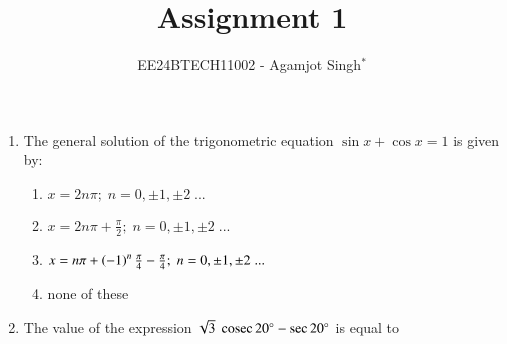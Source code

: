 \documentclass[journal,12pt,twocolumn]{IEEEtran}
\theoremstyle{remark}
\begin{document}

\title{Assignment 1}
\author{EE24BTECH11002 - Agamjot Singh$^{*}$%
}
\maketitle
\newpage
\bigskip

\begin{enumerate}
\section*{ C. MCQs with One Correct Answer}
    \setcounter{enumi}{4}

    \item The general solution of the trigonometric equation $\sin {x} + \cos{x} = 1$ is given by:
        
        \hfill{}
        \begin{enumerate}[label={(\alph*)}]
            \item $x = 2n\pi;\;n = 0,\pm1,\pm2\;...$
            \item $x = 2n\pi+\frac{\pi}{2};\;n = 0,\pm1,\pm2\;...$
            \item $x = n\pi+\left(-1\right)^n\frac{\pi}{4}-\frac{\pi}{4};\;n = 0,\pm1,\pm2\;...$
            \item none of these
        \end{enumerate}

    \item The value of the expression $\sqrt{3}\;\,\text{cosec}\,{20^\circ}-\sec{20^\circ}$ is equal to
        
        \hfill{}
        \begin{enumerate}[label={(\alph*)}]
        \end{enumerate}
        

\end{enumerate}
\end{document}

